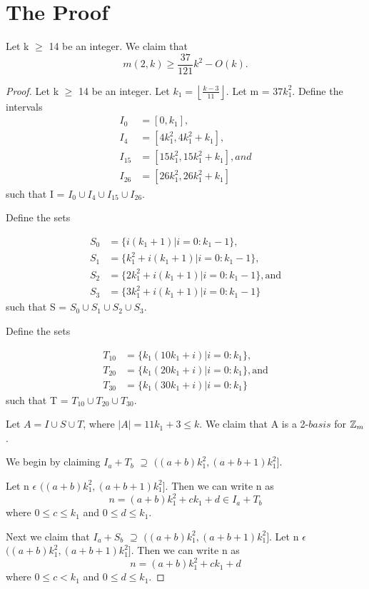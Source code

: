 \section{ The Proof}
Let k $\geq$ 14 be an integer. We claim that
 \[
m(2,k) \geq \frac{37}{121}k^2 - O(k). 
\]

\begin{proof}
Let k $\geq$ 14 be an integer. Let $k_1 = \left \lfloor \frac{k - 3}{11} \right \rfloor$. Let m = $37k_1^2$.  Define the intervals
\begin{align*}
I_0 &= [0, k_1], \\
I_4 &= [4k_1^2, 4k_1^2+k_1], \\
I_{15} &= [15k_1^2, 15k_1^2+k_1], and \\
I_{26} &= [26k_1^2, 26k_1^2+k_1] 
\end{align*}
such that I = $I_0 \cup I_4 \cup I_{15} \cup I_{26}.$

Define the sets

\begin{align*}
S_0 &= \{i(k_1 + 1) | i = 0 : k_1 - 1\},\\
S_1 &= \{k_1^2 + i(k_1 + 1) | i = 0 : k_1 - 1\},\\
S_2 &= \{2k_1^2 + i(k_1 + 1) | i = 0 : k_1 - 1\}, \text{and}\\
S_3 &= \{3k_1^2 + i(k_1 + 1) | i = 0 : k_1 - 1\}
\end{align*}
such that S = $S_0 \cup S_1 \cup S_2 \cup S_3.$

Define the sets

\begin{align*}
T_{10} &= \{k_1(10k_1 + i) | i = 0 : k_1\},\\
T_{20} &= \{k_1(20k_1 + i) | i = 0 : k_1\}, \text{and}\\
T_{30} &= \{k_1(30k_1 + i) | i = 0 : k_1\}
\end{align*}
such that T = $T_{10} \cup T_{20} \cup T_{30} .$

Let $A = I \cup S \cup T$, where $|A| = 11k_1 + 3 \leq k$. We claim that A is a 2-$basis$ for $\mbox{$\mathbb Z$}_m$.

We begin by claiming $I_a + T_b$ $\supseteq$ $((a + b)k_1^2 ,  (a + b + 1)k_1^2]$. 

Let n $\epsilon$ $((a + b)k_1^2 ,  (a + b + 1)k_1^2]$.
Then we can write n as 
\[
n = (a + b) k_1^2 + ck_1 + d \in I_a + T_b
\]
where $0 \leq c \leq k_1$ and $0 \leq d \leq k_1$. 

Next we claim that  $I_a + S_b$ $\supseteq$ $((a + b)k_1^2 ,  (a + b + 1)k_1^2]$. 
Let n $\epsilon$ $((a + b)k_1^2 ,  (a + b + 1)k_1^2]$.
Then we can write n as 
\[
n = (a + b) k_1^2 + ck_1 + d 
\]
where  $0 \leq c < k_1$ and $0 \leq d \leq k_1$. 


\end{proof}
